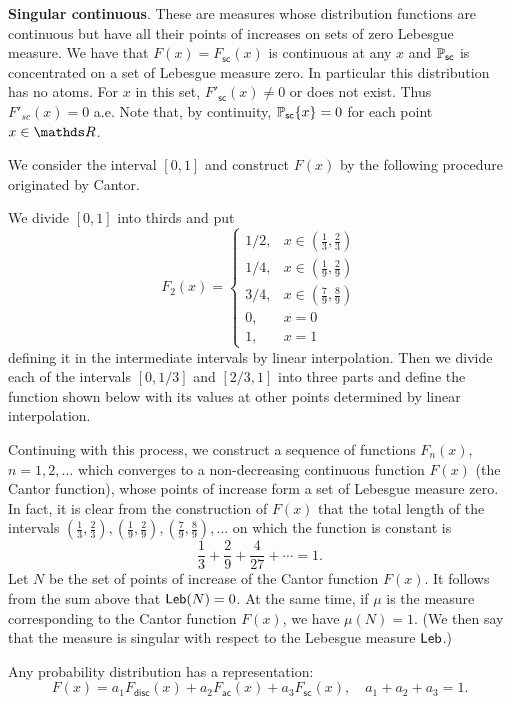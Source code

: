 \textbf{Singular continuous}. These are measures whose distribution functions are continuous but have all their points of increases on sets of zero Lebesgue measure. We have that $F(x) = F_{\mathsf{sc}}(x)$ is continuous at any $x$ and $\mathbb{P}_{\mathsf{sc}}$ is concentrated on a set of Lebesgue measure zero. In particular this distribution has no atoms. For $x$ in this set, $F'_{\mathsf{sc}}(x) \ne 0$ or does not exist. Thus $F'_{sc}(x) = 0$ a.e. Note that, by continuity, $\mathbb{P}_{\mathsf{sc}}\{x\} = 0$ for each point $x\in \R$.
\begin{example}
We consider the interval $[0,1]$ and construct $F(x)$ by the following procedure originated by Cantor. 
\begin{center}
    
\end{center}
We divide $[0,1]$ into thirds and put 
\begin{equation*}
    F_2(x) =
    \begin{cases}
     1/2, & x\in (\frac13, \frac23)\\
     1/4, & x \in (\frac19, \frac29)\\
     3/4, & x \in (\frac79, \frac89)\\
     0, & x = 0\\
     1, & x=1
    \end{cases}
\end{equation*}
defining it in the intermediate intervals by linear interpolation. Then we divide each of the intervals $[0,1/3]$ and $[2/3, 1]$ into three parts and define the function shown below with its values at other points determined by linear interpolation.
\begin{center}
    
\end{center}
Continuing with this process, we construct a sequence of functions $F_n(x)$, $n= 1,2,\dots$ which converges to a non-decreasing continuous function $F(x)$ (the Cantor function), whose points of increase form a set of Lebesgue measure zero. In fact, it is clear from the construction of $F(x)$ that the total length of the intervals $(\frac13, \frac23), (\frac19, \frac29), (\frac79, \frac89), \dots$ on which the function is constant is
\begin{equation*}
    \frac13 + \frac29 + \frac{4}{27} + \cdots = 1.
\end{equation*}
Let $N$ be the set of points of increase of the Cantor function $F(x)$. It follows from the sum above that $\mathsf{Leb}(N) = 0$. At the same time, if $\mu$ is the measure corresponding to the Cantor function $F(x)$, we have $\mu(N) = 1$. (We then say that the measure is singular with respect to the Lebesgue measure $\mathsf{Leb}$.)
\end{example}
\begin{theorem}
Any probability distribution has a representation:
\begin{equation*}
    F(x) = a_1F_{\mathsf{disc}}(x) + a_2 F_{\mathsf{ac}}(x) + a_3F_{\mathsf{sc}}(x), \quad a_1+a_2+a_3 =1.
\end{equation*}
\end{theorem}

